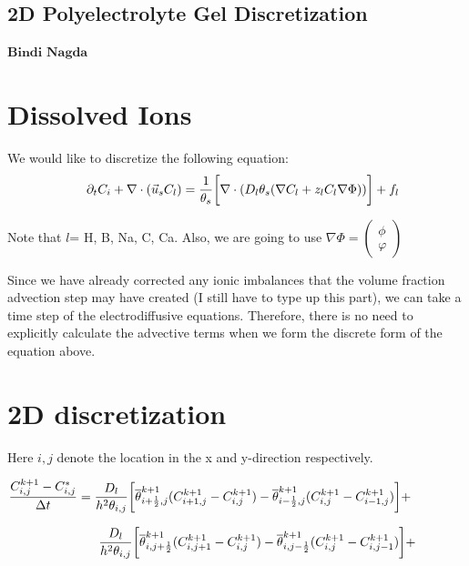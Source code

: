 \documentclass[11pt,a4paper]{article}
\begin{document}
\begin{center}
\section{2D Polyelectrolyte Gel Discretization}
$\textbf{Bindi}$ $\textbf{Nagda}$
\end{center}

\date{}
\begin{flushleft}
\section{Dissolved Ions}

We would like to discretize the following equation:
\begin{align}
\bigskip \quad \partial_tC_i + \nabla \cdot  (\vec{u}_s C_l) = \dfrac{1}{\theta_s}\bigg[\nabla \cdot (D_l\theta_s(\nabla C_l + z_l C_l \nabla \Phi))\bigg] + f_l 
\end{align}

Note that $l$= H, B, Na, C, Ca. Also, we are going to use $\nabla \Phi = \begin{pmatrix} \phi \\ \varphi \end{pmatrix}$ \medskip

Since we have already corrected any ionic imbalances that the volume fraction advection step may have created (I still have to type up this part), we can take a time step of the electrodiffusive equations. Therefore, there is no need to explicitly calculate the advective terms when we form the discrete form of the equation above. 

\section{2D discretization}

Here $i,j$ denote the location in the x and y-direction respectively. 

\bigskip $\dfrac{C^{k+1}_{i,j}-C^*_{i,j}}{\Delta t} =  \dfrac{D_l}{h^2 \theta_{i,j}}\bigg[ \overline{\theta}^{k+1}_{i+\frac{1}{2},j}(C^{k+1}_{i+1,j}-C^{k+1}_{i,j}) -  \overline{\theta}^{k+1}_{i-\frac{1}{2},j}(C^{k+1}_{i,j}-C^{k+1}_{i-1,j})\bigg] + \medskip$ 

$\hspace{2.5cm} \dfrac{D_l}{h^2 \theta_{i,j}}\bigg[ \overline{\theta}^{k+1}_{i,j+\frac{1}{2}}(C^{k+1}_{i,j+1}-C^{k+1}_{i,j}) -  \overline{\theta}^{k+1}_{i,j-\frac{1}{2}}(C^{k+1}_{i,j}-C^{k+1}_{i,j-1})\bigg] + \medskip  $


\end{flushleft}
\end{document}
